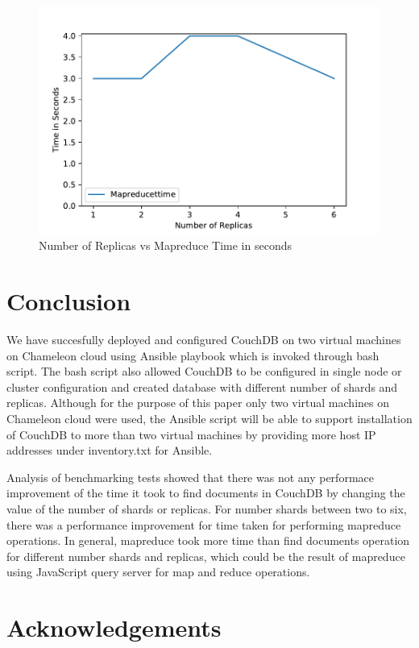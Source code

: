 \begin{figure}[!ht]
  \centering\includegraphics[width=\columnwidth]{../images/ReplicasMapReduce.pdf}
  \caption{Number of Replicas vs Mapreduce Time in seconds }\label{f:replica-mapreduce}
\end{figure}

\section{Conclusion}
We have succesfully deployed and configured CouchDB  on two virtual machines
on Chameleon cloud using Ansible playbook which is invoked through
bash script. The bash script also allowed CouchDB to be configured in
single node or cluster configuration and created database with
different number of shards and replicas. Although for the purpose of
this paper only two virtual machines on Chameleon cloud were used,
the Ansible script will be able to support installation of CouchDB to more
than two virtual machines by providing more host IP addresses under
inventory.txt for Ansible.

Analysis of benchmarking tests showed that there was not any performace
improvement of the time it took to find documents in CouchDB  by
changing the value of the number of shards or replicas. For number
shards between two to six, there was a performance improvement for
time taken for performing mapreduce operations. In general, mapreduce
took more time than find documents operation for different number
shards and replicas, which could be the result of mapreduce using
JavaScript query server for map and reduce operations.


\section*{Acknowledgements}

